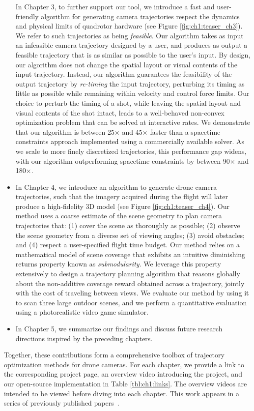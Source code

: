 \begin{itemize}
In Chapter 3, to further support our tool, we introduce a fast and user-friendly algorithm for generating camera trajectories respect the dynamics and physical limits of quadrotor hardware (see Figure \ref{fig:ch1:teaser_ch3}).
We refer to such trajectories as being \emph{feasible}.
Our algorithm takes as input an infeasible camera trajectory designed by a user, and produces as output a feasible trajectory that is as similar as possible to the user's input.
By design, our algorithm does not change the spatial layout or  visual contents of the input trajectory.
Instead, our algorithm guarantees the feasibility of the output trajectory by \emph{re-timing} the input trajectory, perturbing its timing as little as possible while remaining within velocity and control force limits.
Our choice to perturb the timing of a shot, while leaving the spatial layout and visual contents of the shot intact, leads to a well-behaved non-convex optimization problem that can be solved at interactive rates.
We demonstrate that our algorithm is between 25$\times$ and 45$\times$ faster than a spacetime constraints approach implemented using a commercially available solver.
As we scale to more finely discretized trajectories, this performance gap widens, with our algorithm outperforming spacetime constraints by between 90$\times$ and 180$\times$.

\item

In Chapter 4, we introduce an algorithm to generate drone camera trajectories, such that the imagery acquired during the flight will later produce a high-fidelity 3D model (see Figure \ref{fig:ch1:teaser_ch4}). Our method uses a coarse estimate of the scene geometry to plan camera trajectories that: (1) cover the scene as thoroughly as possible; (2) observe the scene geometry from a diverse set of viewing angles; (3) avoid obstacles; and (4) respect a user-specified flight time
budget. Our method relies on a mathematical model of scene coverage that exhibits an intuitive diminishing returns property known as \emph{submodularity}.
We leverage this property extensively to design a trajectory planning algorithm  that reasons globally about the non-additive coverage reward obtained across a trajectory, jointly with the cost of traveling between views.
We evaluate our method by using it to scan three large outdoor scenes, and we perform a quantitative evaluation using a photorealistic video game simulator.

\item

In Chapter 5, we summarize our findings and discuss future research directions inspired by the preceding chapters.

\end{itemize}

\noindent Together, these contributions form a comprehensive toolbox of trajectory optimization methods for drone cameras.
For each chapter, we provide a link to the corresponding project page, an overview video introducing the project, and our open-source implementation in Table \ref{tbl:ch1:links}.
The overview videos are intended to be viewed before diving into each chapter.
This work appears in a series of previously published papers~\cite{joubert:2015,roberts:2016,roberts:2017}.
